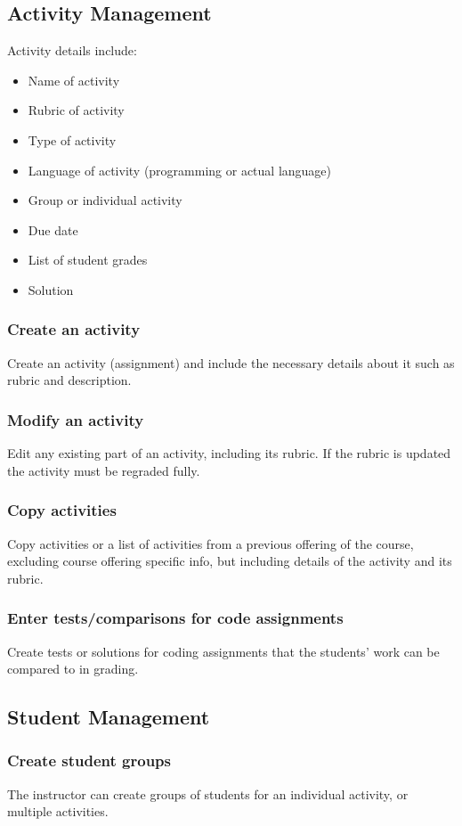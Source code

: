 \documentclass{article}
\begin{document}
\subsection{Activity Management}
Activity details include:
\begin {itemize}
	\item Name of activity
	\item Rubric of activity
	\item Type of activity
	\item Language of activity (programming or actual language)
	\item Group or individual activity
	\item Due date
	\item List of student grades
	\item Solution
\end {itemize}
\subsubsection{Create an activity}
Create an activity (assignment) and include the necessary details about it such 
as rubric and description.
\subsubsection{Modify an activity}
Edit any existing part of an activity, including its rubric. If the rubric is updated
the activity must be regraded fully.
\subsubsection{Copy activities}
Copy activities or a list of activities from a previous offering of the course, excluding
course offering specific info, but including details of the activity and its rubric.
\subsubsection{Enter tests/comparisons for code assignments}
Create tests or solutions for coding assignments that the students' work can be compared
to in grading.
\subsection{Student Management}
\subsubsection{Create student groups}
The instructor can create groups of students for an individual activity, or
multiple activities. 
\end{document}
